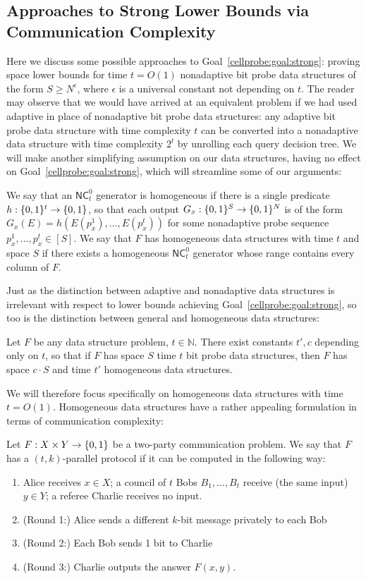 \subsection{Approaches to Strong Lower Bounds via Communication Complexity}\label{cellprobe:subsec:communication}

Here we discuss some possible approaches to Goal~\ref{cellprobe:goal:strong}: proving space lower bounds for time $t=O(1)$ nonadaptive bit probe data structures of the form $S \geq N^\epsilon$, where $\epsilon$ is a universal constant not depending on $t$. The reader may observe that we would have arrived at an equivalent problem if we had used adaptive in place of nonadaptive bit probe data structures: any adaptive bit probe data structure with time complexity $t$ can be converted into a nonadaptive data structure with time complexity $2^t$ by unrolling each query decision tree. We will make another simplifying assumption on our data structures, having no effect on Goal~\ref{cellprobe:goal:strong}, which will streamline some of our arguments:
\begin{definition}
We say that an $\mathsf{NC}^0_t$ generator is homogeneous if there is a single predicate $h: \{0,1\}^t \to \{0,1\}$, so that each output $G_x: \{0,1\}^S \to \{0,1\}^N$ is of the form $G_x(E) = h(E(p_x^1),\ldots,E(p_x^t))$ for some nonadaptive probe sequence $p_x^1,\ldots,p_x^t \in [S]$. We say that $F$ has homogeneous data structures with time $t$ and space $S$ if there exists a homogeneous $\mathsf{NC}^0_t$ generator whose range contains every column of $F$.
\end{definition}
Just as the distinction between adaptive and nonadaptive data structures is irrelevant with respect to lower bounds achieving Goal~\ref{cellprobe:goal:strong}, so too is the distinction between general and homogeneous data structures:
\begin{lemma}
Let $F$ be any data structure problem, $t \in \mathbb{N}$. There exist constants $t',c$ depending only on $t$, so that if $F$ has space $S$ time $t$ bit probe data structures, then $F$ has space $c \cdot S$ and time $t'$ homogeneous data structures.
\end{lemma}

We will therefore focus specifically on homogeneous data structures with time $t = O(1)$.
Homogeneous data structures have a rather appealing formulation in terms of communication complexity:
\begin{definition}
Let $F: X \times Y \to \{0,1\}$ be a two-party communication problem. We say that $F$ has a $(t,k)$-parallel protocol if it can be computed in the following way:
\begin{enumerate}
	\item Alice receives $x \in X$; a council of $t$ Bobs $B_1,\ldots, B_t$ receive (the same input) $y \in Y$; a referee Charlie receives no input.
	\item (Round 1:) Alice sends a different $k$-bit message privately to each Bob
	\item (Round 2:) Each Bob sends 1 bit to Charlie
	\item (Round 3:) Charlie outputs the answer $F(x,y)$.
\end{enumerate}
\end{definition}

